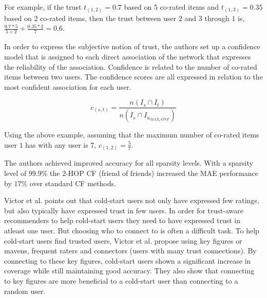 For example, if the trust $t_{(1,2)} = 0.7$ based on 5 co-rated items
and $t_{(1,3)} = 0.35$ based on 2 co-rated items, then the trust
between user $2$ and $3$ through $1$ is, $\frac{0.7*5}{5+2} + \frac{0.35*2}{7} = 0.6$.

In order to express the subjective notion of trust, the authors set up a
confidence model that is assigned to each direct association of the network
that expresses the reliability of the association. Confidence is related to the
number of co-rated items between two users. The confidence scores are all
expressed in relation to the most confident association for each user.

\begin{equation}
c_{(s,t)} = \frac{n(I_{s} \cap I_{t})}{n(I_{s} \cap I_{u_{MAX_CONF}})}
\end{equation}

Using the above example, assuming that the maximum number of co-rated items
user $1$ has with any user is 7, $c_{(1,2)} = \frac{5}{7}$.

The authors achieved improved accuracy for all sparsity levels. With a sparsity
level of $99.9\%$ the 2-HOP CF (friend of friends) increased the MAE
performance by $17\%$ over standard CF methods.


Victor et al. \cite{Victor2008} points out that cold-start users not only have
expressed few ratings, but also typically have expressed trust in few users. In
order for trust-aware recommenders to help cold-start users they need to have
expressed trust in atleast one user. But choosing who to connect to is often a
difficult task. To help cold-start users find trusted users, Victor et al.
propose using key figures or mavens, frequent raters and connectors (users with
many trust connections). By connecting to these key figures, cold-start users
shown a significant increase in coverage while still maintaining good accuracy.
They also show that connecting to key figures are more beneficial to a
cold-start user than connecting to a random user.

